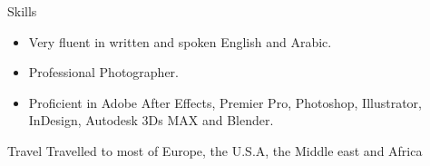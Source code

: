\documentclass{resume}
\begin{document}
\begin{small}
	
	\begin{rSection}{Skills}
		\begin{itemize}
			\itemsep -0.4em
			\item Very fluent in written and spoken English and Arabic.
			\item Professional Photographer.
			\item Proficient in Adobe After Effects, Premier Pro, Photoshop, Illustrator, InDesign, Autodesk 3Ds MAX and Blender.
		\end{itemize}
	\end{rSection}
	\begin{rSection}{Travel}
		Travelled to most of Europe, the U.S.A, the Middle east and Africa
	\end{rSection}
\end{small}
	
\end{document}
